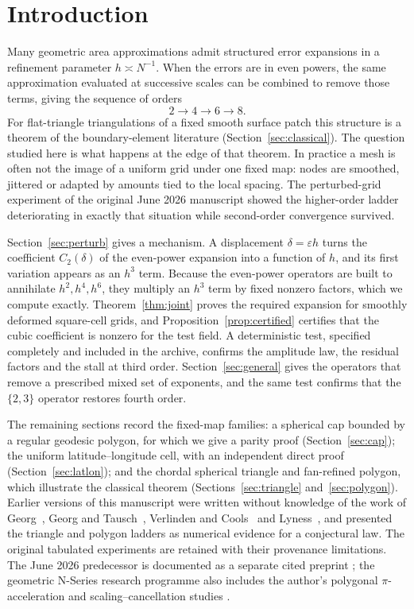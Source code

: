 \documentclass[11pt]{article}
\theoremstyle{remark}
\begin{document}
\section{Introduction}
Many geometric area approximations admit structured error expansions in a refinement
parameter $h\asymp N^{-1}$. When the errors are in even powers, the same approximation
evaluated at successive scales can be combined to remove those terms, giving the sequence of
orders
\[
2\longrightarrow 4\longrightarrow 6\longrightarrow 8 .
\]
For flat-triangle triangulations of a fixed smooth surface patch this structure is a theorem
of the boundary-element literature (Section~\ref{sec:classical}). The question studied here is
what happens at the edge of that theorem. In practice a mesh is often not the image of a
uniform grid under one fixed map: nodes are smoothed, jittered or adapted by amounts tied to
the local spacing. The perturbed-grid experiment of the original June 2026 manuscript showed
the higher-order ladder deteriorating in exactly that situation while second-order
convergence survived.

Section~\ref{sec:perturb} gives a mechanism. A displacement $\delta=\varepsilon h$ turns the
coefficient $C_2(\delta)$ of the even-power expansion into a function of $h$, and its first
variation appears as an $h^3$ term. Because the even-power operators are built to annihilate
$h^2,h^4,h^6$, they multiply an $h^3$ term by fixed nonzero factors, which we compute
exactly. Theorem~\ref{thm:joint} proves the required expansion for smoothly deformed
square-cell grids, and Proposition~\ref{prop:certified} certifies that the cubic coefficient
is nonzero for the test field. A deterministic test, specified completely and included in the archive, confirms the
amplitude law, the residual factors and the stall at third order.
Section~\ref{sec:general} gives the operators that remove a prescribed mixed set of
exponents, and the same test confirms that the $\{2,3\}$ operator restores fourth order.

The remaining sections record the fixed-map families: a spherical cap bounded by a regular
geodesic polygon, for which we give a parity proof (Section~\ref{sec:cap}); the uniform
latitude--longitude cell, with an independent direct proof (Section~\ref{sec:latlon}); and the
chordal spherical triangle and fan-refined polygon, which illustrate the classical theorem
(Sections~\ref{sec:triangle} and~\ref{sec:polygon}). Earlier versions of this manuscript were
written without knowledge of the work of Georg~\cite{georg91}, Georg and
Tausch~\cite{georgtausch}, Verlinden and Cools~\cite{verlindencools} and
Lyness~\cite{lyness94}, and presented the triangle and polygon ladders as numerical evidence
for a conjectural law. The original tabulated experiments are retained with their provenance
limitations. The June 2026 predecessor is documented as a separate cited preprint
\cite{baker2026spherical}; the geometric N-Series research programme also includes the
author's polygonal $\pi$-acceleration and scaling--cancellation studies
\cite{baker2026pi,baker2026scaling}.
\end{document}
